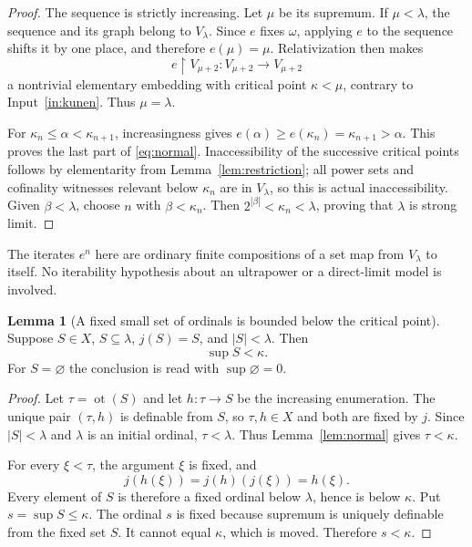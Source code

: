\documentclass[11pt,letterpaper]{article}
\theoremstyle{definition}
\newtheorem{lemma}[definition]{Lemma}
\numberwithin{equation}{section}
\newcommand{\ot}{\operatorname{ot}}
\newcommand{\restr}{\mathbin{\upharpoonright}}
\begin{document}
\begin{proof}
The sequence is strictly increasing. Let $\mu$ be its supremum. If $\mu<\lambda$, the sequence and its graph belong to $V_\lambda$. Since $e$ fixes $\omega$, applying $e$ to the sequence shifts it by one place, and therefore $e(\mu)=\mu$. Relativization then makes
\[
       e\restr V_{\mu+2}:V_{\mu+2}\longrightarrow V_{\mu+2}
\]
a nontrivial elementary embedding with critical point $\kappa<\mu$, contrary to Input~\ref{in:kunen}. Thus $\mu=\lambda$.

For $\kappa_n\le\alpha<\kappa_{n+1}$, increasingness gives
$e(\alpha)\ge e(\kappa_n)=\kappa_{n+1}>\alpha$.
This proves the last part of \eqref{eq:normal}. Inaccessibility of the successive critical points follows by elementarity from Lemma~\ref{lem:restriction}; all power sets and cofinality witnesses relevant below $\kappa_n$ are in $V_\lambda$, so this is actual inaccessibility. Given $\beta<\lambda$, choose $n$ with $\beta<\kappa_n$. Then $2^{|\beta|}<\kappa_n<\lambda$, proving that $\lambda$ is strong limit.
\end{proof}

The iterates $e^n$ here are ordinary finite compositions of a set map from $V_\lambda$ to itself. No iterability hypothesis about an ultrapower or a direct-limit model is involved.

\begin{lemma}[A fixed small set of ordinals is bounded below the critical point]\label{lem:ordinalset}
Suppose $S\in X$, $S\subseteq\lambda$, $j(S)=S$, and $|S|<\lambda$. Then
\begin{equation}\label{eq:belowcrit}
                  \sup S<\kappa.
\end{equation}
For $S=\varnothing$ the conclusion is read with $\sup\varnothing=0$.
\end{lemma}

\begin{proof}
Let $\tau=\ot(S)$ and let $h:\tau\to S$ be the increasing enumeration. The unique pair $(\tau,h)$ is definable from $S$, so $\tau,h\in X$ and both are fixed by $j$. Since $|S|<\lambda$ and $\lambda$ is an initial ordinal, $\tau<\lambda$. Thus Lemma~\ref{lem:normal} gives $\tau<\kappa$.

For every $\xi<\tau$, the argument $\xi$ is fixed, and
\[
 j(h(\xi))=j(h)(j(\xi))=h(\xi).
\]
Every element of $S$ is therefore a fixed ordinal below $\lambda$, hence is below $\kappa$. Put $s=\sup S\le\kappa$. The ordinal $s$ is fixed because supremum is uniquely definable from the fixed set $S$. It cannot equal $\kappa$, which is moved. Therefore $s<\kappa$.
\end{proof}
\end{document}
